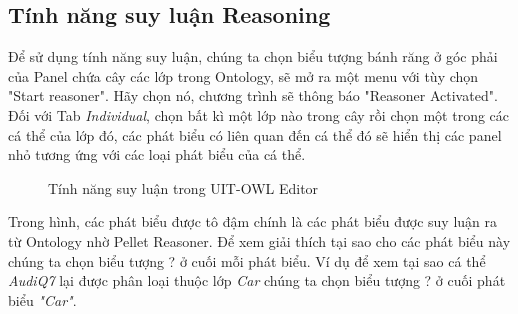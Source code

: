 \subsection{Tính năng suy luận Reasoning}
Để sử dụng tính năng suy luận, chúng ta chọn biểu tượng bánh răng ở góc phải của Panel chứa cây các lớp trong Ontology, sẽ mở ra một menu với tùy chọn "Start reasoner". Hãy chọn nó, chương trình sẽ thông báo "Reasoner Activated". Đối với Tab \textit{Individual}, chọn bất kì một lớp nào trong cây rồi chọn một trong các cá thể của lớp đó, các phát biểu có liên quan đến cá thể đó sẽ hiển thị các panel nhỏ tương ứng với các loại phát biểu của cá thể.
\begin{figure}[h!]
	\centering
	\caption{Tính năng suy luận trong UIT-OWL Editor\label{overflow}}
\end{figure}
Trong hình, các phát biểu được tô đậm chính là các phát biểu được suy luận ra từ Ontology nhờ Pellet Reasoner. Để xem giải thích tại sao cho các phát biểu này chúng ta chọn biểu tượng ? ở cuối mỗi phát biểu. Ví dụ để xem tại sao cá thể \textit{AudiQ7} lại được phân loại thuộc lớp \textit{Car} chúng ta chọn biểu tượng ? ở cuối phát biểu \textit{"Car"}.
